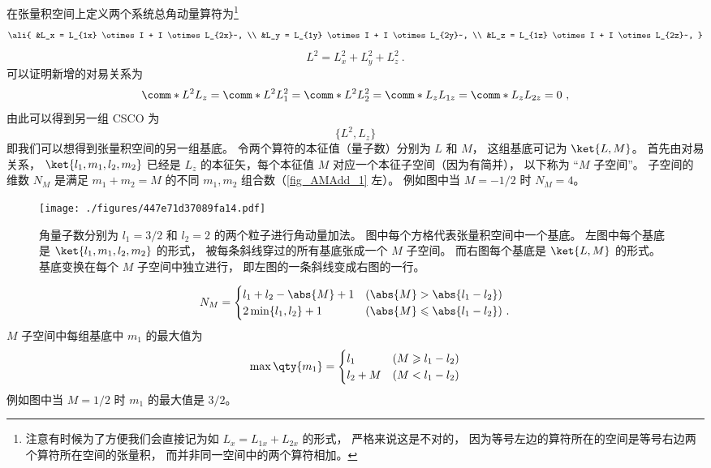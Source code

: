 在张量积空间上定义两个系统总角动量算符为\footnote{注意有时候为了方便我们会直接记为如 $L_x = L_{1x} + L_{2x}$ 的形式， 严格来说这是不对的， 因为等号左边的算符所在的空间是等号右边两个算符所在空间的张量积， 而并非同一空间中的两个算符相加。}
\begin{equation}\ali{
&L_x = L_{1x} \otimes I +  I \otimes L_{2x}~, \\
&L_y = L_{1y} \otimes I +  I \otimes L_{2y}~, \\
&L_z = L_{1z} \otimes I +  I \otimes L_{2z}~,
}\end{equation}
\begin{equation}
L^2 = L_x^2 + L_y^2 + L_z^2~.
\end{equation}
可以证明新增的对易关系为
\begin{equation}
\comm*{L^2}{L_z} = \comm*{L^2}{L_1^2} = \comm*{L^2}{L_2^2} = 
\comm*{L_z}{L_{1z}} = \comm*{L_z}{L_{2z}} = 0~,
\end{equation}
由此可以得到另一组 CSCO 为 %
\begin{equation}
\{L^2, L_z\}
\end{equation}
即我们可以想得到张量积空间的另一组基底。 令两个算符的本征值（量子数）分别为 $L$  和 $M$， 这组基底可记为 $\ket{L, M}$。  首先由对易关系， $\ket{l_1, m_1, l_2, m_2}$ 已经是 $L_z$ 的本征矢，每个本征值 $M$ 对应一个本征子空间（因为有简并）， 以下称为 “$M$ 子空间”。 子空间的维数 $N_M$ 是满足 $m_1 + m_2 = M$ 的不同 $m_1,m_2$ 组合数（\autoref{fig_AMAdd_1} 左）。 例如图中当 $M = -1/2$ 时 $N_M = 4$。
\begin{figure}[ht]
\centering
\texttt{[image: ./figures/447e71d37089fa14.pdf]}
\caption{角量子数分别为 $l_1 = 3/2$ 和 $l_2 = 2$ 的两个粒子进行角动量加法。 图中每个方格代表张量积空间中一个基底。 左图中每个基底是 $\ket{l_1, m_1, l_2, m_2}$ 的形式， 被每条斜线穿过的所有基底张成一个 $M$ 子空间。 而右图每个基底是 $\ket{L, M}$ 的形式。 基底变换在每个 $M$ 子空间中独立进行， 即左图的一条斜线变成右图的一行。} \label{fig_AMAdd_1}
\end{figure}

\begin{equation}
N_M =
\begin{cases}
l_1 + l_2 - \abs{M} + 1 &(\abs{M} > \abs{l_1 - l_2}) \\
2\min\{l_1, l_2\}  + 1   &(\abs{M} \leqslant\abs{l_1 - l_2})~.
\end{cases}
\end{equation}
$M$ 子空间中每组基底中 $m_1$ 的最大值为
\begin{equation}
\max \qty{m_1} =
\begin{cases}
l_1 \quad &(M \geqslant l_1 - l_2)  \\
l_2 + M &(M < l_1 - l_2)
\end{cases}
\end{equation}
例如图中当 $M = 1/2$ 时 $m_1$ 的最大值是 $3/2$。

